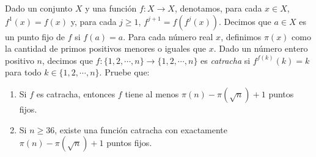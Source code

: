 Dado un conjunto $X$ y una función $f : X \rightarrow X$, denotamos, para cada $x \in X$, $f^1(x) = f(x)$ y, para cada $j \geq 1$, $f^{j+1} = f(f^j(x))$. Decimos que $a \in X$ es un punto fijo de $f$ si $f(a) = a$. Para cada número real $x$, definimos $\pi (x)$ como la cantidad de primos positivos menores o iguales que $x$. Dado un número entero positivo $n$, decimos que $f : \{ 1,2, \cdots , n \} \rightarrow \{ 1,2, \cdots , n \}$ es \emph{catracha} si $f^{f(k)}(k) = k$ para todo $k \in \{ 1,2, \cdots ,n\}$. Pruebe que:
\begin{enumerate}
   \item Si $f$ es catracha, entonces $f$ tiene al menos $\pi (n)- \pi (\sqrt{n})+1$ puntos fijos.
   \item Si $n \geq 36$, existe una función catracha con exactamente $\pi (n) - \pi (\sqrt{n})+1$ puntos fijos.
 \end{enumerate} 
